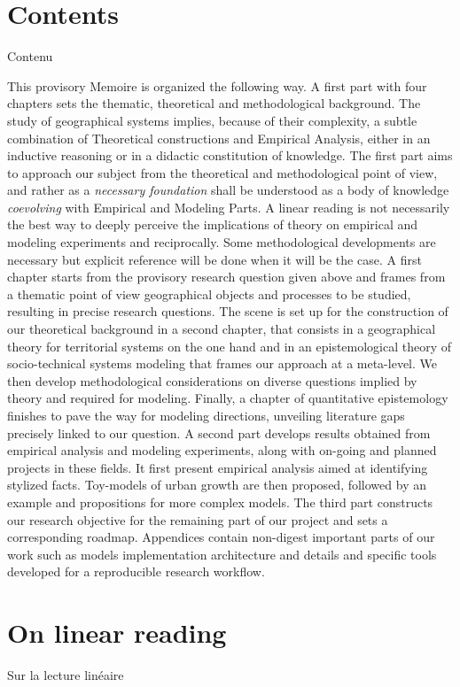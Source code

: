 


\section*{Contents}{Contenu}



This provisory Memoire is organized the following way. A first part with four chapters sets the thematic, theoretical and methodological background. The study of geographical systems implies, because of their complexity, a subtle combination of Theoretical constructions and Empirical Analysis, either in an inductive reasoning or in a didactic constitution of knowledge. The first part aims to approach our subject from the theoretical and methodological point of view, and rather as a \textit{necessary foundation} shall be understood as a body of knowledge \emph{coevolving} with Empirical and Modeling Parts. A linear reading is not necessarily the best way to deeply perceive the implications of theory on empirical and modeling experiments and reciprocally. Some methodological developments are necessary but explicit reference will be done when it will be the case. A first chapter starts from the provisory research question given above and frames from a thematic point of view geographical objects and processes to be studied, resulting in precise research questions. The scene is set up for the construction of our theoretical background in a second chapter, that consists in a geographical theory for territorial systems on the one hand and in an epistemological theory of socio-technical systems 
 modeling that frames our approach at a meta-level. 
 We then develop methodological considerations on diverse questions implied by theory and required for modeling. Finally, a chapter of quantitative epistemology finishes to pave the way for modeling directions, unveiling literature gaps precisely linked to our question. A second part develops results obtained from empirical analysis and modeling experiments, along with on-going and planned projects in these fields. It first present empirical analysis aimed at identifying stylized facts. Toy-models of urban growth are then proposed, followed by an example and propositions for more complex models. The third part constructs our research objective for the remaining part of our project and sets a corresponding roadmap. Appendices contain non-digest important parts of our work such as models implementation architecture and details and specific tools developed for a reproducible research workflow.



\section*{On linear reading}{Sur la lecture linéaire}











  



